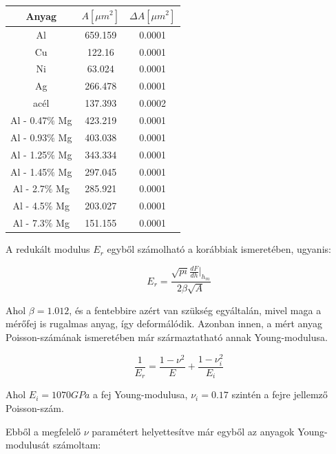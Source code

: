 \documentclass[a4paper,12pt]{article}
\begin{document}
\begin{center}
\begin{tabular}{|c|c|c|}
\hline
Anyag & $A [\mu m^{2}]$ & $\Delta A [\mu m^{2}]$ \\
\hline
Al &659.159 &0.0001\\
\hline
Cu &122.16 &0.0001\\
\hline
Ni& 63.024 &0.0001\\
\hline
Ag &266.478 &0.0001\\
\hline
acél& 137.393 &0.0002\\
\hline
Al - 0.47$\%$ Mg &423.219 &0.0001\\
\hline
Al - 0.93$\%$ Mg &403.038 &0.0001\\
\hline
Al - 1.25$\%$ Mg &343.334 &0.0001\\
\hline
Al - 1.45$\%$ Mg &297.045 &0.0001\\
\hline
Al - 2.7$\%$ Mg &285.921 &0.0001\\
\hline
Al - 4.5$\%$ Mg &203.027 &0.0001\\
\hline
Al - 7.3$\%$ Mg &151.155 &0.0001\\
\hline
\end{tabular}
\end{center}

\par A redukált modulus $E_{r}$ egyből számolható a korábbiak ismeretében, ugyanis:

\begin{equation*}
E_{r} = \frac{\sqrt{pi}\frac{dF}{dh}|_{h_{m}}}{2\beta\sqrt{A}}
\end{equation*}

\par Ahol $\beta = 1.012$, és a fentebbire azért van szükség egyáltalán, mivel maga a mérőfej is rugalmas anyag, így deformálódik. Azonban innen, a mért anyag Poisson-számának ismeretében már származtatható annak Young-modulusa.

\begin{equation*}
\frac{1}{E_{r}} = \frac{1 - \nu^{2}}{E} + \frac{1-\nu^{2}_{i}}{E_{i}}
\end{equation*}

\par Ahol $E_{i} = 1070 GPa$ a fej Young-modulusa, $\nu_{i} = 0.17$ szintén a fejre jellemző Poisson-szám.

\par Ebből a megfelelő $\nu$ paramétert helyettesítve már egyből az anyagok Young-modulusát számoltam:
\end{document}
